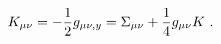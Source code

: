 \begin{equation}
K_{\mu\nu}=-\frac{1}{2}g_{\mu\nu,y}
	=\Sigma_{\mu\nu}
	+{1\over 4} g_{\mu\nu} K \  .
\label{eq:decompose} 
\end{equation}

